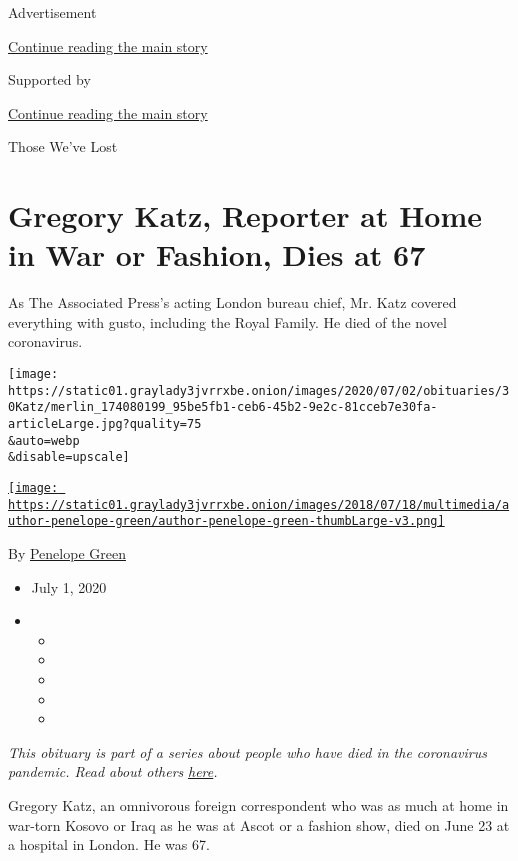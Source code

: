Advertisement

\protect\hyperlink{after-top}{Continue reading the main story}

Supported by

\protect\hyperlink{after-sponsor}{Continue reading the main story}

Those We've Lost

\hypertarget{gregory-katz-reporter-at-home-in-war-or-fashion-dies-at-67}{%
\section{Gregory Katz, Reporter at Home in War or Fashion, Dies at
67}\label{gregory-katz-reporter-at-home-in-war-or-fashion-dies-at-67}}

As The Associated Press's acting London bureau chief, Mr. Katz covered
everything with gusto, including the Royal Family. He died of the novel
coronavirus.

\texttt{[image: https://static01.graylady3jvrrxbe.onion/images/2020/07/02/obituaries/30Katz/merlin\_174080199\_95be5fb1-ceb6-45b2-9e2c-81cceb7e30fa-articleLarge.jpg?quality=75\\\&auto=webp\\\&disable=upscale]}

\href{https://www.nytimes3xbfgragh.onion/by/penelope-green}{\texttt{[image: https://static01.graylady3jvrrxbe.onion/images/2018/07/18/multimedia/author-penelope-green/author-penelope-green-thumbLarge-v3.png]}}

By \href{https://www.nytimes3xbfgragh.onion/by/penelope-green}{Penelope
Green}

\begin{itemize}
\item
  July 1, 2020
\item
  \begin{itemize}
  \item
  \item
  \item
  \item
  \item
  \end{itemize}
\end{itemize}

\emph{This obituary is part of a series about people who have died in
the coronavirus pandemic. Read about others}
\href{https://www.nytimes3xbfgragh.onion/series/people-who-have-died-of-the-coronavirus}{\emph{here}}\emph{.}

Gregory Katz, an omnivorous foreign correspondent who was as much at
home in war-torn Kosovo or Iraq as he was at Ascot or a fashion show,
died on June 23 at a hospital in London. He was 67.

